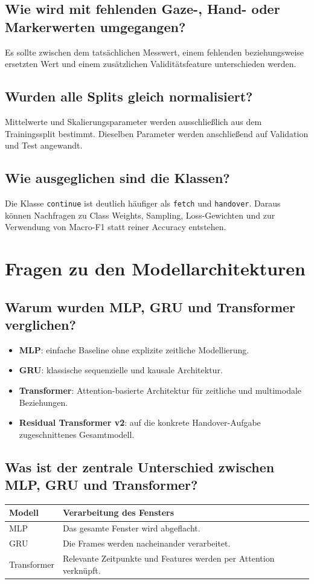 \documentclass[11pt,a4paper]{article}
\begin{document}
\subsection*{Wie wird mit fehlenden Gaze-, Hand- oder Markerwerten umgegangen?}
Es sollte zwischen dem tatsächlichen Messwert, einem fehlenden beziehungsweise ersetzten Wert und einem zusätzlichen Validitätsfeature unterschieden werden.

\subsection*{Wurden alle Splits gleich normalisiert?}
Mittelwerte und Skalierungsparameter werden ausschließlich aus dem Trainingssplit bestimmt. Dieselben Parameter werden anschließend auf Validation und Test angewandt.

\subsection*{Wie ausgeglichen sind die Klassen?}
Die Klasse \texttt{continue} ist deutlich häufiger als \texttt{fetch} und \texttt{handover}. Daraus können Nachfragen zu Class Weights, Sampling, Loss-Gewichten und zur Verwendung von Macro-F1 statt reiner Accuracy entstehen.

\section{Fragen zu den Modellarchitekturen}

\subsection*{Warum wurden MLP, GRU und Transformer verglichen?}
\begin{itemize}
    \item \textbf{MLP}: einfache Baseline ohne explizite zeitliche Modellierung.
    \item \textbf{GRU}: klassische sequenzielle und kausale Architektur.
    \item \textbf{Transformer}: Attention-basierte Architektur für zeitliche und multimodale Beziehungen.
    \item \textbf{Residual Transformer v2}: auf die konkrete Handover-Aufgabe zugeschnittenes Gesamtmodell.
\end{itemize}

\subsection*{Was ist der zentrale Unterschied zwischen MLP, GRU und Transformer?}
\begin{center}
\begin{tabular}{ll}
\toprule
Modell & Verarbeitung des Fensters \\
\midrule
MLP & Das gesamte Fenster wird abgeflacht. \\
GRU & Die Frames werden nacheinander verarbeitet. \\
Transformer & Relevante Zeitpunkte und Features werden per Attention verknüpft. \\
\bottomrule
\end{tabular}
\end{center}
\end{document}

